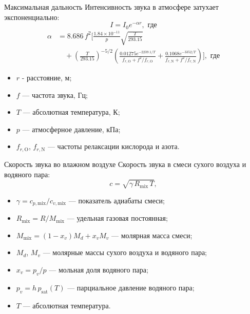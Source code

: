 \documentclass[10pt]{beamer}
\begin{document}
\begin{frame}{Максимальная дальность}
\justifying
Интенсивность звука в атмосфере затухает экспоненциально:
\begin{equation*}
  I = I_0 e^{-\alpha r}, \text{ где}
  \end{equation*}
  {\footnotesize
  \begin{align*}
  \alpha &=
  8.686 \, f^2
  \Biggl[
  \frac{1.84 \times 10^{-11}}{p}
  \sqrt{\frac{T}{293.15}}
  \\[0.5em]
  &\quad+
  \left(\frac{T}{293.15}\right)^{-5/2}
  \left(
  \frac{0.01275 e^{-2239.1/T}}{f_{r,\mathrm{O}} + f^2/f_{r,\mathrm{O}}}
  +
  \frac{0.1068 e^{-3352/T}}{f_{r,\mathrm{N}} + f^2/f_{r,\mathrm{N}}}
  \right)
  \Biggr],\text{ где}
  \end{align*}
  }
  {\footnotesize
  \begin{itemize}
  \item $r$ - расстояние, м;
  \item $f$ — частота звука, Гц;
  \item $T$ — абсолютная температура, К;
  \item $p$ — атмосферное давление, кПа;
  \item $f_{r,\mathrm{O}}$, $f_{r,\mathrm{N}}$ — частоты релаксации кислорода и азота.
  \end{itemize}
  }

\end{frame}

\begin{frame}{Скорость звука во влажном воздухе}
\justifying
Скорость звука в смеси сухого воздуха и водяного пара:
\begin{equation*}
c = \sqrt{\gamma\, R_{\mathrm{mix}}\, T},
\end{equation*}

\smallskip

\begin{itemize}
\item $\gamma = c_{p,\mathrm{mix}} / c_{v,\mathrm{mix}}$ — показатель адиабаты смеси;
\item $R_{\mathrm{mix}} = R / M_{\mathrm{mix}}$ — удельная газовая постоянная;
\item $M_{\mathrm{mix}} = (1 - x_v) M_d + x_v M_v$ — молярная масса смеси;
\item $M_d$, $M_v$ — молярные массы сухого воздуха и водяного пара;
\item $x_v = p_v / p$ — мольная доля водяного пара;
\item $p_v = h\, p_{\mathrm{sat}}(T)$ — парциальное давление водяного пара;
\item $T$ — абсолютная температура.
\end{itemize}

\end{frame}
\end{document}
